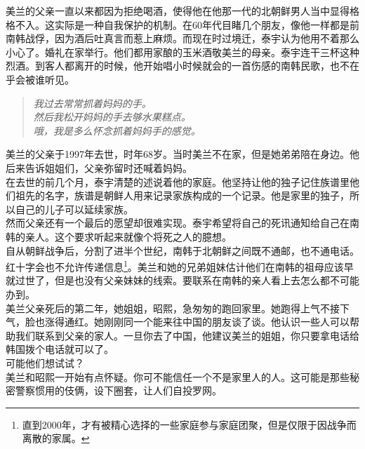 美兰的父亲一直以来都因为拒绝喝酒，使得他在他那一代的北朝鲜男人当中显得格格不入。这实际是一种自我保护的机制。在60年代目睹几个朋友，像他一样都是前南韩战俘，因为酒后吐真言而惹上麻烦。而现在时过境迁，泰宇认为他用不着那么小心了。婚礼在家举行。他们都用家酿的玉米酒敬美兰的母亲。泰宇连干三杯这种烈酒。到客人都离开的时候，他开始唱小时候就会的一首伤感的南韩民歌，也不在乎会被谁听见。\\

\begin{quote}
	\begin{spacing}{1.0}  %
		\textit{{\footnotesize 	我过去常常抓着妈妈的手。\\
		然后我松开妈妈的手去够水果糕点。\\
		哦，我是多么怀念抓着妈妈手的感觉。\\}}
	\end{spacing}
\end{quote}

美兰的父亲于1997年去世，时年68岁。当时美兰不在家，但是她弟弟陪在身边。他后来告诉姐姐们，父亲弥留时还喊着妈妈。\\

在去世的前几个月，泰宇清楚的述说着他的家庭。他坚持让他的独子记住族谱里他们祖先的名字，族谱是朝鲜人用来记录家族构成的一个记录。他是家里的独子，所以自己的儿子可以延续家族。\\

然而父亲还有一个最后的愿望却很难实现。泰宇希望将自己的死讯通知给自己在南韩的亲人。这个要求听起来就像个将死之人的臆想。\\

自从朝鲜战争后，分割了进半个世纪，南韩于北朝鲜之间既不通邮，也不通电话。红十字会也不允许传递信息\footnote{直到2000年，才有被精心选择的一些家庭参与家庭团聚，但是仅限于因战争而离散的家属。}。美兰和她的兄弟姐妹估计他们在南韩的祖母应该早就过世了，但是也没有父亲妹妹的线索。要联系在南韩的亲人看上去怎么都不可能办到。\\

美兰父亲死后的第二年，她姐姐，昭熙，急匆匆的跑回家里。她跑得上气不接下气，脸也涨得通红。她刚刚同一个能来往中国的朋友谈了谈。他认识一些人可以帮助我们联系到父亲的家人。一旦你去了中国，他建议美兰的姐姐，你只要拿电话给韩国拨个电话就可以了。\\

可能他们想试试？\\

美兰和昭熙一开始有点怀疑。你可不能信任一个不是家里人的人。这可能是那些秘密警察惯用的伎俩，设下圈套，让人们自投罗网。\\

